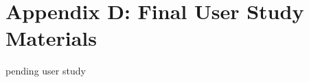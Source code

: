 \section{Appendix D: Final User Study
Materials}\label{appendix-d-final-user-study-materials}

pending user study
